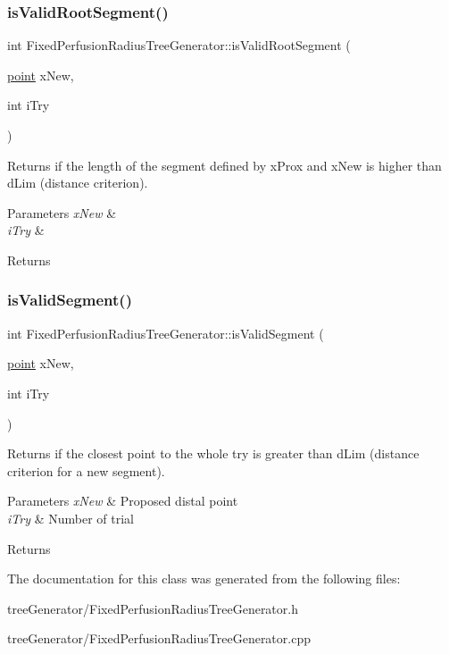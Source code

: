 \subsubsection{\texorpdfstring{is\+Valid\+Root\+Segment()}{isValidRootSegment()}}
{\footnotesize\ttfamily int Fixed\+Perfusion\+Radius\+Tree\+Generator\+::is\+Valid\+Root\+Segment (\begin{DoxyParamCaption}\item[{\mbox{\hyperlink{structpoint}{point}}}]{x\+New,  }\item[{int}]{i\+Try }\end{DoxyParamCaption})\hspace{0.3cm}{\ttfamily [protected]}}

Returns if the length of the segment defined by x\+Prox and x\+New is higher than d\+Lim (distance criterion). 
\begin{DoxyParams}{Parameters}
{\em x\+New} & \\
\hline
{\em i\+Try} & \\
\hline
\end{DoxyParams}
\begin{DoxyReturn}{Returns}

\end{DoxyReturn}
\mbox{\label{class_fixed_perfusion_radius_tree_generator_a306a08e5b09ced0a19fcfae49c7e7399}} 
\subsubsection{\texorpdfstring{is\+Valid\+Segment()}{isValidSegment()}}
{\footnotesize\ttfamily int Fixed\+Perfusion\+Radius\+Tree\+Generator\+::is\+Valid\+Segment (\begin{DoxyParamCaption}\item[{\mbox{\hyperlink{structpoint}{point}}}]{x\+New,  }\item[{int}]{i\+Try }\end{DoxyParamCaption})\hspace{0.3cm}{\ttfamily [protected]}}

Returns if the closest point to the whole try is greater than d\+Lim (distance criterion for a new segment). 
\begin{DoxyParams}{Parameters}
{\em x\+New} & Proposed distal point \\
\hline
{\em i\+Try} & Number of trial \\
\hline
\end{DoxyParams}
\begin{DoxyReturn}{Returns}

\end{DoxyReturn}


The documentation for this class was generated from the following files\+:\begin{DoxyCompactItemize}
\item 
tree\+Generator/Fixed\+Perfusion\+Radius\+Tree\+Generator.\+h\item 
tree\+Generator/Fixed\+Perfusion\+Radius\+Tree\+Generator.\+cpp\end{DoxyCompactItemize}
